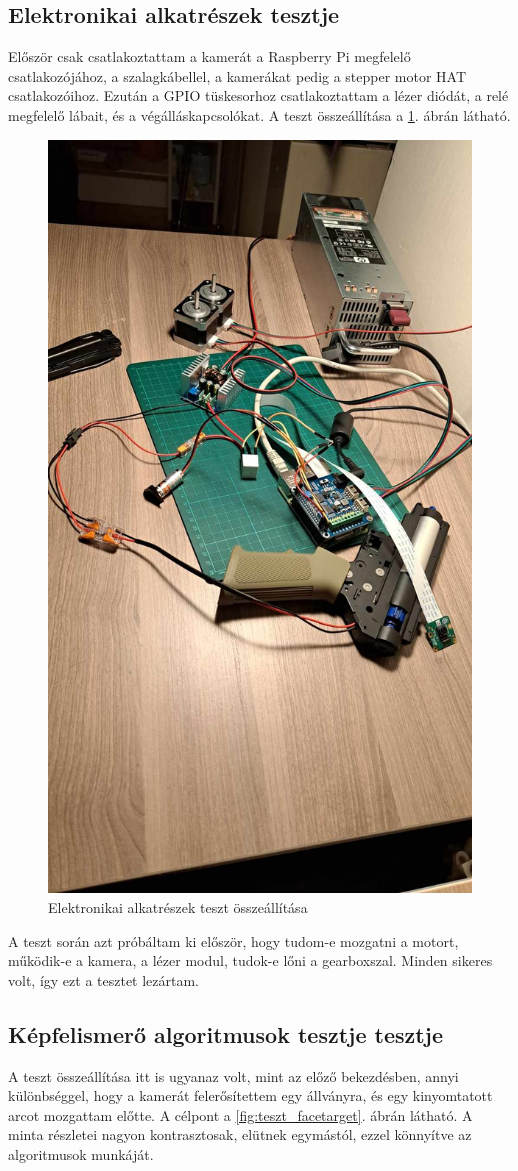 \documentclass[12pt,a4paper]{article}
\begin{document}
\subsection{Elektronikai alkatrészek tesztje}
Először csak csatlakoztattam a kamerát a Raspberry Pi megfelelő csatlakozójához, a szalagkábellel, a kamerákat pedig a stepper motor HAT csatlakozóihoz. Ezután a GPIO tüskesorhoz csatlakoztattam a lézer diódát, a relé megfelelő lábait, és a végálláskapcsolókat. A teszt összeállítása a \ref{fig:teszt_1}. ábrán látható.

\begin{figure}[h!]
	\centering
	\includegraphics[width=0.6\linewidth]{teszt_1}
	\caption{Elektronikai alkatrészek teszt összeállítása}
	\label{fig:teszt_1}
\end{figure}

A teszt során azt próbáltam ki először, hogy tudom-e mozgatni a motort, működik-e a kamera, a lézer modul, tudok-e lőni a gearboxszal. Minden sikeres volt, így ezt a tesztet lezártam.

\subsection{Képfelismerő algoritmusok tesztje tesztje}
A teszt összeállítása itt is ugyanaz volt, mint az előző bekezdésben, annyi különbséggel, hogy a kamerát felerősítettem egy állványra, és egy kinyomtatott arcot mozgattam előtte. A célpont a \ref{fig:teszt_facetarget}. ábrán látható. A minta részletei nagyon kontrasztosak, elütnek egymástól, ezzel könnyítve az algoritmusok munkáját.
\end{document}
